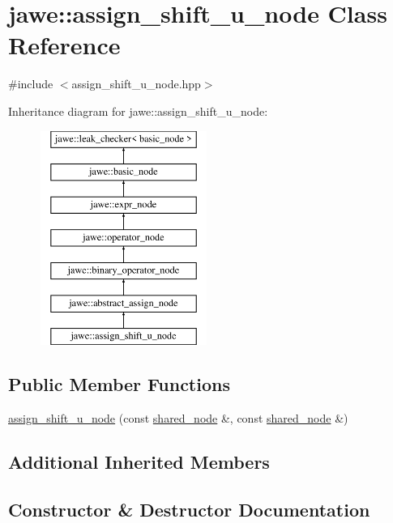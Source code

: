 \hypertarget{classjawe_1_1assign__shift__u__node}{}\section{jawe\+:\+:assign\+\_\+shift\+\_\+u\+\_\+node Class Reference}
\label{classjawe_1_1assign__shift__u__node}


{\ttfamily \#include $<$assign\+\_\+shift\+\_\+u\+\_\+node.\+hpp$>$}

Inheritance diagram for jawe\+:\+:assign\+\_\+shift\+\_\+u\+\_\+node\+:\begin{figure}[H]
\begin{center}
\leavevmode
\includegraphics[height=7.000000cm]{classjawe_1_1assign__shift__u__node}
\end{center}
\end{figure}
\subsection*{Public Member Functions}
\begin{DoxyCompactItemize}
\item 
\hyperlink{classjawe_1_1assign__shift__u__node_a965641af110ec3272f699be47e06bc3c}{assign\+\_\+shift\+\_\+u\+\_\+node} (const \hyperlink{namespacejawe_a3f307481d921b6cbb50cc8511fc2b544}{shared\+\_\+node} \&, const \hyperlink{namespacejawe_a3f307481d921b6cbb50cc8511fc2b544}{shared\+\_\+node} \&)
\end{DoxyCompactItemize}
\subsection*{Additional Inherited Members}


\subsection{Constructor \& Destructor Documentation}
\mbox{\label{classjawe_1_1assign__shift__u__node_a965641af110ec3272f699be47e06bc3c}} 
